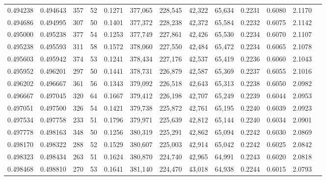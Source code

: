 \begin{tabular}{rrrrrrrrrrrrr}
0.494238 & 0.494643 &    357 &    52 &                                     0.1271 & 377,065 & 228,545 &  42,322 &  65,634 & 0.2231 & 0.6080 & 2.1170 \\
0.494686 & 0.494995 &    307 &    50 &                                     0.1401 & 377,372 & 228,238 &  42,372 &  65,584 & 0.2232 & 0.6075 & 2.1142 \\
0.495000 & 0.495238 &    377 &    54 &                                     0.1253 & 377,749 & 227,861 &  42,426 &  65,530 & 0.2234 & 0.6070 & 2.1107 \\
0.495238 & 0.495593 &    311 &    58 &                                     0.1572 & 378,060 & 227,550 &  42,484 &  65,472 & 0.2234 & 0.6065 & 2.1078 \\
0.495603 & 0.495942 &    374 &    53 &                                     0.1241 & 378,434 & 227,176 &  42,537 &  65,419 & 0.2236 & 0.6060 & 2.1043 \\
0.495952 & 0.496201 &    297 &    50 &                                     0.1441 & 378,731 & 226,879 &  42,587 &  65,369 & 0.2237 & 0.6055 & 2.1016 \\
0.496202 & 0.496667 &    361 &    56 &                                     0.1343 & 379,092 & 226,518 &  42,643 &  65,313 & 0.2238 & 0.6050 & 2.0982 \\
0.496667 & 0.497045 &    320 &    64 &                                     0.1667 & 379,412 & 226,198 &  42,707 &  65,249 & 0.2239 & 0.6044 & 2.0953 \\
0.497051 & 0.497500 &    326 &    54 &                                     0.1421 & 379,738 & 225,872 &  42,761 &  65,195 & 0.2240 & 0.6039 & 2.0923 \\
0.497534 & 0.497758 &    233 &    51 &                                     0.1796 & 379,971 & 225,639 &  42,812 &  65,144 & 0.2240 & 0.6034 & 2.0901 \\
0.497778 & 0.498163 &    348 &    50 &                                     0.1256 & 380,319 & 225,291 &  42,862 &  65,094 & 0.2242 & 0.6030 & 2.0869 \\
0.498170 & 0.498322 &    288 &    52 &                                     0.1529 & 380,607 & 225,003 &  42,914 &  65,042 & 0.2242 & 0.6025 & 2.0842 \\
0.498323 & 0.498434 &    263 &    51 &                                     0.1624 & 380,870 & 224,740 &  42,965 &  64,991 & 0.2243 & 0.6020 & 2.0818 \\
0.498468 & 0.498810 &    270 &    53 &                                     0.1641 & 381,140 & 224,470 &  43,018 &  64,938 & 0.2244 & 0.6015 & 2.0793 \\

\end{tabular}
